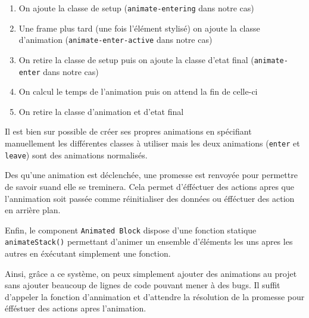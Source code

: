 \begin{enumerate}
    \item On ajoute la classe de setup (\texttt{animate-entering} dans notre cas)
    \item Une frame plus tard (une fois l'élément stylisé) on ajoute la classe d'animation (\texttt{animate-enter-active} dans notre cas)
    \item On retire la classe de setup puis on ajoute la classe d'etat final (\texttt{animate-enter} dans notre cas)
    \item On calcul le temps de l'animation puis on attend la fin de celle-ci
    \item On retire la classe d'animation et d'etat final
\end{enumerate}

Il est bien sur possible de créer ses propres animations en spécifiant manuellement les différentes classes à utiliser mais les deux animations (\texttt{enter} et \texttt{leave}) sont des animations normalisés.

Des qu'une animation est déclenchée, une promesse est renvoyée pour permettre de savoir suand elle se treminera.
Cela permet d'éfféctuer des actions apres que l'annimation soit passée comme réinitialiser des données ou éfféctuer des action en arrière plan.

Enfin, le component \texttt{Animated Block} dispose d'une fonction statique \texttt{animateStack()} permettant d'animer un ensemble d'éléments les uns apres les autres en éxécutant simplement une fonction.

Ainsi, grâce a ce système, on peux simplement ajouter des animations au projet sans ajouter beaucoup de lignes de code pouvant mener à des bugs.
Il suffit d'appeler la fonction d'annimation et d'attendre la résolution de la promesse pour éfféstuer des actions apres l'animation.